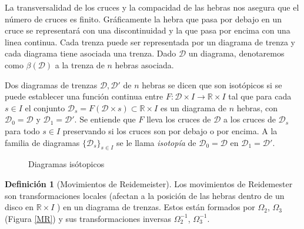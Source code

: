 \documentclass[12pt]{book}
\theoremstyle{definition}
\newtheorem{defi}{Definición}[section]
\begin{document}
La transversalidad de los cruces y la compacidad de las hebras nos asegura que el número de cruces es finito. Gráficamente la hebra que pasa por debajo en un cruce se representará con una discontinuidad y la que pasa por encima con una linea continua. Cada trenza puede ser representada por un diagrama de trenza y cada diagrama tiene asociada una trenza. Dado $\mathcal{D}$ un diagrama, denotaremos como $\beta(\mathcal{D})$ a la trenza de $n$ hebras asociada.

Dos diagramas de trenzas $\mathcal{D}, \mathcal{D}'$ de $n$ hebras se dicen que son isotópicos si se puede establecer una función continua entre $F:\mathcal{D}\times I\rightarrow\mathbb{R}\times I$ tal que para cada $s\in I$ el conjunto $\mathcal{D}_s = F(\mathcal{D}\times s)\subset\mathbb{R}\times I$ es un diagrama de $n$ hebras, con $\mathcal{D}_0 = \mathcal{D}$ y $\mathcal{D}_1 = \mathcal{D}'$. Se entiende que $F$ lleva los cruces de $\mathcal{D}$ a los cruces de $\mathcal{D}_s$ para todo $s\in I$ preservando si los cruces son por debajo o por encima. A la familia de diagramas $\{\mathcal{D}_s\}_{s\in I}$ se le llama \textit{isotopía} de $\mathcal{D}_0 = \mathcal{D}$ en $\mathcal{D}_1 = \mathcal{D}'$.




\begin{figure}[h!]
\centering
{}
\caption{Diagramas isótopicos}
\label{fig:d_iso}
\end{figure}







\begin{defi}[Movimientos de Reidemeister]  Los movimientos de Reidemester son transformaciones locales (afectan a la posición de las hebras dentro de un disco en 
$ \mathbb{R}\times I $ ) en un diagrama de trenzas. Estos están formados por $\Omega_2$, $\Omega_3$ (Figura \ref{MR}) y sus transformaciones inversas
$\Omega_2^{-1}$, $\Omega_3^{-1}$. 

\end{defi}
\end{document}

